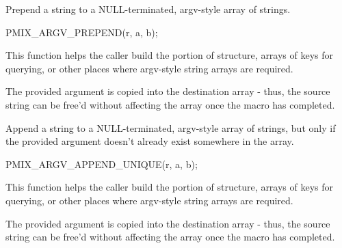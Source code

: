 \summary

Prepend a string to a NULL-terminated, argv-style array of strings.

\cspecificstart
\begin{codepar}
PMIX_ARGV_PREPEND(r, a, b);
\end{codepar}
\cspecificend

\begin{arglist}
\end{arglist}

\descr

This function helps the caller build the  portion of  structure, arrays of keys for querying, or other places where argv-style string arrays are required.

\adviceuserstart
The provided argument is copied into the destination array - thus, the source string can be free'd without affecting the array once the macro has completed.
\adviceuserend


\summary

Append a string to a NULL-terminated, argv-style array of strings, but only if the provided argument doesn't already exist somewhere in the array.

\cspecificstart
\begin{codepar}
PMIX_ARGV_APPEND_UNIQUE(r, a, b);
\end{codepar}
\cspecificend

\begin{arglist}
\end{arglist}

\descr

This function helps the caller build the  portion of  structure, arrays of keys for querying, or other places where argv-style string arrays are required.

\adviceuserstart
The provided argument is copied into the destination array - thus, the source string can be free'd without affecting the array once the macro has completed.
\adviceuserend


